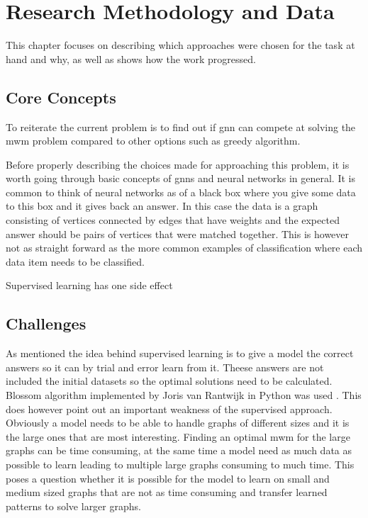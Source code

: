 \chapter{Research Methodology and Data}

This chapter focuses on describing which approaches were chosen for the task at hand and why, as well as shows how the work progressed. 

\section{Core Concepts}

To reiterate the current problem is to find out if \gls{gnn} can compete at solving the \gls{mwm} problem compared to other options such as greedy algorithm.

Before properly describing the choices made for approaching this problem, it is worth going through basic concepts of \gls{gnn}s and neural networks in general. It is common to think of neural networks as of a black box where you give some data to this box and it gives back an answer. In this case the data is a graph consisting of vertices connected by edges that have weights and the expected answer should be pairs of vertices that were matched together. This is however not as straight forward as the more common examples of classification where each data item needs to be classified.  


Supervised learning has one side effect

\section{Challenges}

As mentioned the idea behind supervised learning is to give a model the correct answers so it can by trial and error learn from it. Theese answers are not included the initial datasets so the optimal solutions need to be calculated. Blossom algorithm implemented by Joris van Rantwijk in Python was used \cite{mwmBlossom}. This does however point out an important weakness of the supervised approach. Obviously a model needs to be able to handle graphs of different sizes and it is the large ones that are most interesting. Finding an optimal \gls{mwm} for the large graphs can be time consuming, at the same time a model need as much data as possible to learn leading to multiple large graphs consuming to much time. This poses a question whether it is possible for the model to learn on small and medium sized graphs that are not as time consuming and transfer learned patterns to solve larger graphs.


